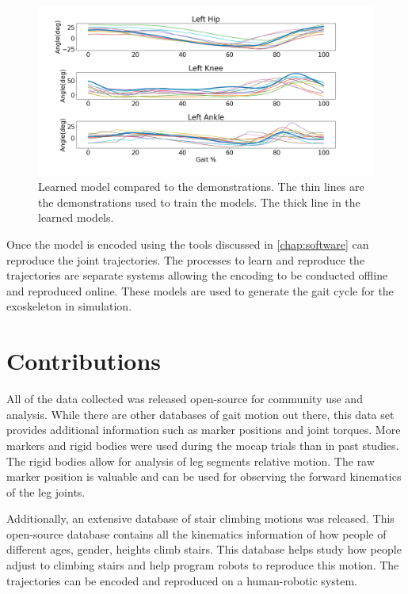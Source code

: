 \begin{figure}[h]
    \centering
    \includegraphics[scale=0.35]{images/gait_data/learnedModel.png}
    \caption[Learned Gait Model]{Learned model compared to the demonstrations. The thin lines are the demonstrations used to train the models. The thick line in the learned models.}
    \label{fig:learnedModel}
\end{figure}

Once the model is encoded using the tools discussed in \autoref{chap:software} can reproduce the joint trajectories. The processes to learn and reproduce the trajectories are separate systems allowing the encoding to be conducted offline and reproduced online. These models are used to generate the gait cycle for the exoskeleton in simulation. 


\section{Contributions}

All of the data collected was released open-source for community use and analysis. While there are other databases of gait motion out there, this data set provides additional information such as marker positions and joint torques. More markers and rigid bodies were used during the mocap trials than in past studies. The rigid bodies allow for analysis of leg segments relative motion. The raw marker position is valuable and can be used for observing the forward kinematics of the leg joints. 

Additionally, an extensive database of stair climbing motions was released. This open-source database contains all the kinematics information of how people of different ages, gender, heights climb stairs. This database helps study how people adjust to climbing stairs and help program robots to reproduce this motion. The trajectories can be encoded and reproduced on a human-robotic system. 